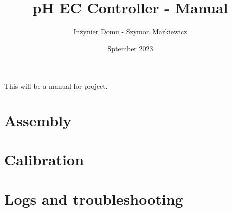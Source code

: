 \documentclass{article}
\title{pH EC Controller - Manual}
\author{Inżynier Domu - Szymon Markiewicz}
\date{Sptember 2023}
\begin{document}
\maketitle
\tableofcontents

This will be a manual for project.

\section{Assembly}
\section{Calibration}
\section{Logs and troubleshooting}
\end{document}

